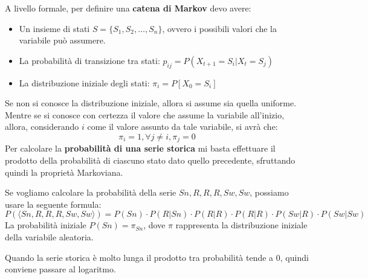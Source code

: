 A livello formale, per definire una \textbf{catena di Markov} devo avere:
\begin{itemize}
    \item Un insieme di stati $S = \{S_1, S_2, \dots, S_n\}$, ovvero i possibili
          valori che la variabile può assumere.
    \item La probabilità di transizione tra stati: $p_{ij} = P(X_{t+1} = S_i | X_t = S_j)$
    \item La distribuzione iniziale degli stati: $\pi_i = P[X_0 = S_i]$
\end{itemize}
Se non si conosce la distribuzione iniziale, allora si assume sia quella uniforme.
Mentre se si conosce con certezza il valore che assume la variabile all'inizio,
allora, considerando $i$ come il valore assunto da tale variabile, si avrà che:
\begin{equation*}
    \pi_i = 1, \forall j \neq i, \pi_j = 0
\end{equation*}
Per calcolare la \textbf{probabilità di una serie storica} mi basta effettuare
il prodotto della probabilità di ciascuno stato dato quello precedente, sfruttando
quindi la proprietà Markoviana.
\begin{esempio}
    Se vogliamo calcolare la probabilità della serie $Sn, R,R,R,Sw,Sw$, possiamo
    usare la seguente formula:
    \begin{equation*}
        P(\langle Sn, R,R,R,Sw,Sw \rangle) = P(Sn) \cdot P(R|Sn) \cdot P(R|R)
        \cdot P(R|R)\cdot P(Sw|R) \cdot P(Sw|Sw)
    \end{equation*}
    La probabilità iniziale $P(Sn) = \pi_{Sn}$, dove $\pi$ rappresenta la
    distribuzione iniziale della variabile aleatoria.
\end{esempio}
Quando la serie storica è molto lunga il prodotto tra probabilità tende a $0$,
quindi conviene passare al logaritmo.

